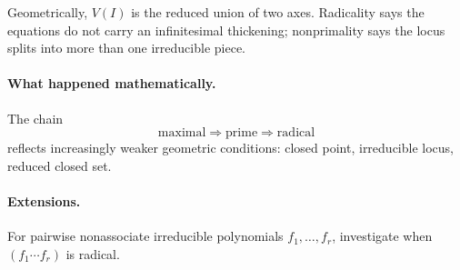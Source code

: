 Geometrically, \(V(I)\) is the reduced union of two axes.  Radicality says the equations do
not carry an infinitesimal thickening; nonprimality says the locus splits into more than one
irreducible piece.

\paragraph{What happened mathematically.}
The chain
\[
\text{maximal}\Rightarrow\text{prime}\Rightarrow\text{radical}
\]
reflects increasingly weaker geometric conditions: closed point, irreducible locus, reduced
closed set.

\paragraph{Extensions.}
For pairwise nonassociate irreducible polynomials \(f_1,\dots,f_r\), investigate when
\((f_1\cdots f_r)\) is radical.
\fi
